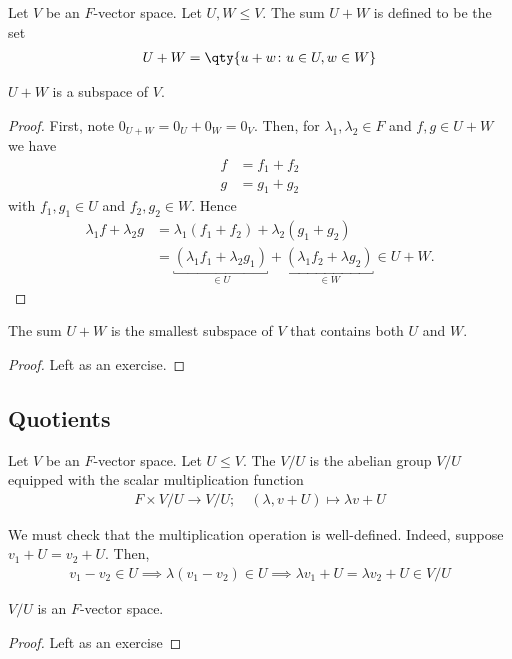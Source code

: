 \begin{definition}
    Let $V$ be an $F$-vector space.
    Let $U, W \leq V$.
    The sum $U + W$ is defined to be the set
    \begin{align*}
        U + W = \qty{ u + w \colon u \in U, w \in W }
    \end{align*}
\end{definition}
\begin{proposition}
    $U + W$ is a subspace of $V$.
\end{proposition}
\begin{proof}
    First, note $0_{U+W} = 0_U + 0_W = 0_V$.
    Then, for $\lambda_1, \lambda_2 \in F$ and $f, g \in U + W$ we have
    \begin{align*}
        f &= f_1 + f_2 \\
        g &= g_1 + g_2
    \end{align*} with $f_1, g_1 \in U$ and $f_2, g_2 \in W$.
    Hence
    \begin{align*}
        \lambda_1 f + \lambda_2 g &= \lambda_1 (f_1 + f_2) + \lambda_2 (g_1 + g_2) \\
        &= \underbracket{(\lambda_1 f_1 + \lambda_2 g_1)}_{\in U} + \underbracket{(\lambda_1 f_2 + \lambda g_2)}_{\in W} \in U + W.
    \end{align*}
\end{proof}

\begin{proposition}
    The sum $U + W$ is the smallest subspace of $V$ that contains both $U$ and $W$.
\end{proposition}

\begin{proof}
    Left as an exercise.
\end{proof}

\subsection{Quotients}
\begin{definition}[Quotient]
    Let $V$ be an $F$-vector space.
    Let $U \leq V$.
    The  $V / U$ is the abelian group $V / U$ equipped with the scalar multiplication function
    \begin{align*}
        F \times V / U \to V / U;\quad (\lambda, v + U) \mapsto \lambda v + U
    \end{align*}
\end{definition}

\begin{note}
    We must check that the multiplication operation is well-defined.
    Indeed, suppose $v_1 + U = v_2 + U$.
    Then,
    \begin{align*}
        v_1 - v_2 \in U \implies \lambda (v_1 - v_2) \in U \implies \lambda v_1 + U = \lambda v_2 + U \in V / U
    \end{align*}
\end{note}
\begin{proposition}
    $V / U$ is an $F$-vector space.
\end{proposition}
\begin{proof}
    Left as an exercise
\end{proof}

